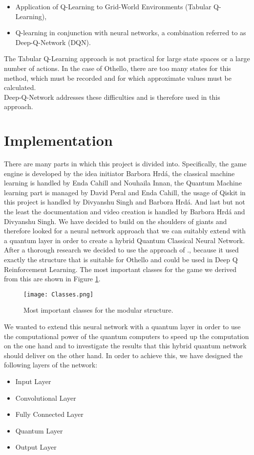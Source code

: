 \documentclass[conference]{IEEEtran}
\begin{document}
\begin{itemize} 
\item  Application of Q-Learning to Grid-World Environments (Tabular Q-Learning),
\item  Q-learning in conjunction with neural networks, a combination referred to as Deep-Q-Network (DQN).
\end{itemize}

The Tabular Q-Learning approach is not practical for large state spaces or a large number of actions. In the case of Othello, there are too many states for this method, which must be recorded and for which approximate values must be calculated.
\\
Deep-Q-Network addresses these difficulties and is therefore used in this approach. 
\\ 
\section{Implementation}
There are many parts in which this project is divided into. Specifically, the game engine is developed by the idea initiator Barbora Hrdá, the classical machine learning is handled by Enda Cahill and Nouhaila Innan, the Quantum Machine learning part is managed by David Peral and Enda Cahill, the usage of Qiskit in this project is handled by Divyanshu Singh and Barbora Hrdá. And last but not the least the documentation and video creation is handled by Barbora Hrdá and Divyanshu Singh. 
We have decided to build on the shoulders of giants and therefore looked for a neural network approach that we can suitably extend with a quantum layer in order to create a hybrid Quantum Classical Neural Network. After a thorough research we decided to use the approach of \cite{a1}., because it used exactly the structure that is suitable for Othello and could be used in Deep Q Reinforcement Learning.  
The most important classes for the game we derived from this are shown in Figure \ref{classes}. 


\begin{figure}[htbp]
\centerline{\texttt{[image: Classes.png]}}
\caption{Most important classes for the modular structure.}
\label{classes}
\end{figure}

We wanted to extend this neural network with a quantum layer in order to use the computational power of the quantum computers to speed up the computation on the one hand and to investigate the results that this hybrid quantum network should deliver on the other hand. 
In order to achieve this, we have designed the following layers of the network: 
\\
\begin{itemize} 
\item Input Layer 
\item Convolutional Layer 
\item Fully Connected Layer
\item Quantum Layer
\item Output Layer
\end{itemize}
\end{document}
